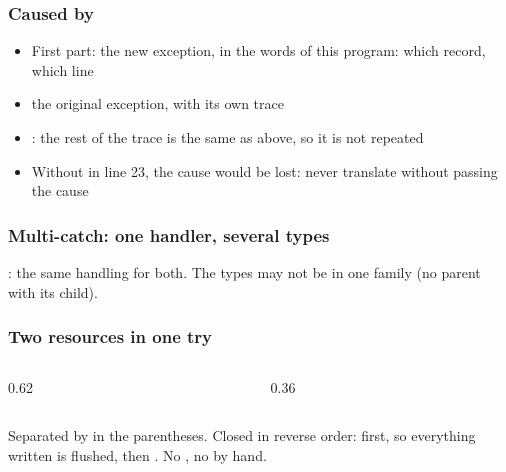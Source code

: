 \documentclass[aspectratio=169,10pt,compress]{beamer}
\begin{document}
\begin{frame}[t,fragile] \frametitle{Caused by}

	\begin{itemize}\small
		\item First part: the new exception, in the words of this program: which record, which line
		\item {} the original exception, with its own trace
		\item {}: the rest of the trace is the same as above, so it is not repeated
		\item Without  in line 23, the cause would be lost: never translate without passing the cause
	\end{itemize}
\end{frame}








\begin{frame}[t,fragile] \frametitle{Multi-catch: one handler, several types}

	\footnotesize {}: the same handling for both. The types may not be in one family (no parent with its child).
\end{frame}




\begin{frame}[t,fragile] \frametitle{Two resources in one try}
	\begin{columns}[T]
		\begin{column}{0.62\textwidth}
		\end{column}
		\begin{column}{0.36\textwidth}
			\uncover<2->{\lstterminal[basicstyle=\ttfamily\scriptsize]{codeoutput/CopyUpper.txt}}
		\end{column}
	\end{columns}

	\footnotesize Separated by \hCode{;} in the parentheses. Closed in reverse order:  first, so everything written is flushed,
	then . No , no  by hand.
\end{frame}
\end{document}
